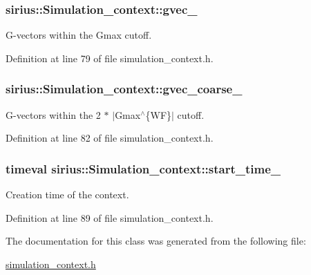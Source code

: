 \hypertarget{classsirius_1_1_simulation__context_aa6a79b4d6a9b7db89180187f8fb2243f}{}
\subsubsection[{gvec\+\_\+}]{ sirius\+::\+Simulation\+\_\+context\+::gvec\+\_\+\hspace{0.3cm}{\ttfamily [private]}}\label{classsirius_1_1_simulation__context_aa6a79b4d6a9b7db89180187f8fb2243f}


G-\/vectors within the Gmax cutoff. 



Definition at line 79 of file simulation\+\_\+context.\+h.

\hypertarget{classsirius_1_1_simulation__context_a0aac68674184d2aefc6abdf0b2ff46a8}{}
\subsubsection[{gvec\+\_\+coarse\+\_\+}]{ sirius\+::\+Simulation\+\_\+context\+::gvec\+\_\+coarse\+\_\+\hspace{0.3cm}{\ttfamily [private]}}\label{classsirius_1_1_simulation__context_a0aac68674184d2aefc6abdf0b2ff46a8}


G-\/vectors within the 2 $\ast$ $\vert$\+Gmax$^\wedge$\{W\+F\}$\vert$ cutoff. 



Definition at line 82 of file simulation\+\_\+context.\+h.

\hypertarget{classsirius_1_1_simulation__context_a1f1edc57f044cacf58dd0c2ece553b51}{}
\subsubsection[{start\+\_\+time\+\_\+}]{\setlength{\rightskip}{0pt plus 5cm}timeval sirius\+::\+Simulation\+\_\+context\+::start\+\_\+time\+\_\+\hspace{0.3cm}{\ttfamily [private]}}\label{classsirius_1_1_simulation__context_a1f1edc57f044cacf58dd0c2ece553b51}


Creation time of the context. 



Definition at line 89 of file simulation\+\_\+context.\+h.



The documentation for this class was generated from the following file\+:\begin{DoxyCompactItemize}
\item 
\hyperlink{simulation__context_8h}{simulation\+\_\+context.\+h}\end{DoxyCompactItemize}

